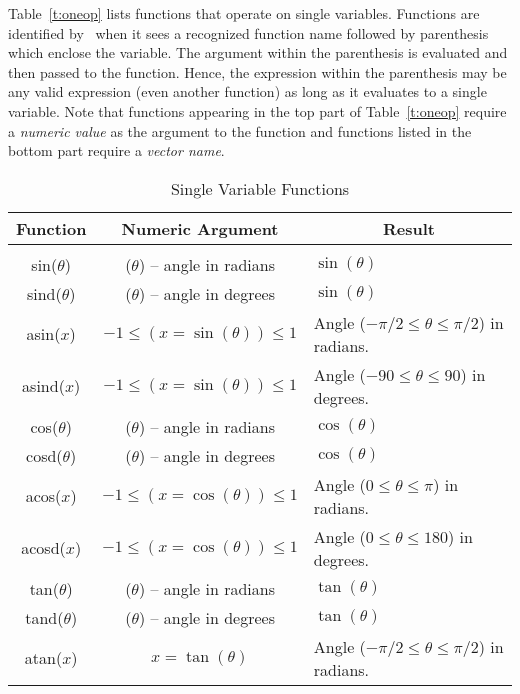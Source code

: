 Table~\ref{t:oneop} lists functions that operate on single variables.
Functions are identified by \wip\ when it sees a recognized function
name followed by parenthesis which enclose the variable.
The argument within the parenthesis is evaluated and then passed to the
function.
Hence, the expression within the parenthesis may be any valid expression
(even another function) as long as it evaluates to a single variable.
Note that functions appearing in the top part of Table~\ref{t:oneop}
require a {\em numeric value} as the argument to the function and
functions listed in the bottom part require a {\em vector name}.
\begin{table}
  \caption{Single Variable Functions}
  \centering
  \begin{tabular}{|c|c|l|} \hline\hline
    \multicolumn{1}{|c}{Function} & \multicolumn{1}{|c}{Numeric Argument}
      & \multicolumn{1}{|c|}{Result} \\ \hline
    && \\
    sin($\theta$)  & ($\theta$) -- angle in radians  & $\sin(\theta)$ \\
    sind($\theta$) & ($\theta$) -- angle in degrees  & $\sin(\theta)$ \\
    asin($x$)      & $-1 \leq (x = \sin(\theta)) \leq 1$
           & Angle ($- \pi / 2 \leq \theta \leq \pi / 2$) in radians. \\
    asind($x$)     & $-1 \leq (x = \sin(\theta)) \leq 1$
           & Angle ($-90 \leq \theta \leq 90$) in degrees.            \\
    cos($\theta$)  & ($\theta$) -- angle in radians  & $\cos(\theta)$ \\
    cosd($\theta$) & ($\theta$) -- angle in degrees  & $\cos(\theta)$ \\
    acos($x$)      & $-1 \leq (x = \cos(\theta)) \leq 1$
           & Angle ($0 \leq \theta \leq \pi$) in radians.             \\
    acosd($x$)     & $-1 \leq (x = \cos(\theta)) \leq 1$
           & Angle ($0 \leq \theta \leq 180$) in degrees.             \\
    tan($\theta$)  & ($\theta$) -- angle in radians  & $\tan(\theta)$ \\
    tand($\theta$) & ($\theta$) -- angle in degrees  & $\tan(\theta)$ \\
    atan($x$)      & $x = \tan(\theta)$
           & Angle ($- \pi / 2 \leq \theta \leq \pi / 2$) in radians. \\

\end{tabular}
\end{table}
